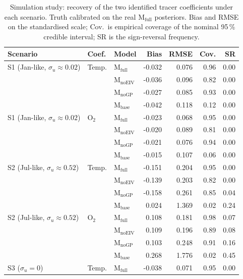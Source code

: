 \begin{table}[h!]
  \caption{Simulation study: recovery of the two identified tracer
           coefficients under each scenario. Truth calibrated on the real
           $\mathrm{M_{full}}$ posteriors. Bias and RMSE on the standardised
           scale; Cov.\ is empirical coverage of the nominal 95\,\% credible
           interval; SR is the sign-reversal frequency.}
  \label{tab:sim_tracers}
  \centering
  \small
  \begin{tabular}{lllrrrr}
    \toprule
    Scenario & Coef. & Model & Bias & RMSE & Cov. & SR \\
    \midrule
    S1 (Jan-like, $\sigma_u\!\approx\!0.02$) & Temp. & $\mathrm{M_{full}}$ & -0.032 & 0.076 & 0.96 & 0.00 \\
     &  & $\mathrm{M_{noEIV}}$ & -0.036 & 0.096 & 0.82 & 0.00 \\
     &  & $\mathrm{M_{noGP}}$ & -0.027 & 0.085 & 0.93 & 0.00 \\
     &  & $\mathrm{M_{base}}$ & -0.042 & 0.118 & 0.12 & 0.00 \\
    \addlinespace
    S1 (Jan-like, $\sigma_u\!\approx\!0.02$) & O$_2$ & $\mathrm{M_{full}}$ & -0.023 & 0.068 & 0.95 & 0.00 \\
     &  & $\mathrm{M_{noEIV}}$ & -0.020 & 0.089 & 0.81 & 0.00 \\
     &  & $\mathrm{M_{noGP}}$ & -0.021 & 0.076 & 0.94 & 0.00 \\
     &  & $\mathrm{M_{base}}$ & -0.015 & 0.107 & 0.06 & 0.00 \\
    \addlinespace
    S2 (Jul-like, $\sigma_u\!\approx\!0.52$) & Temp. & $\mathrm{M_{full}}$ & -0.151 & 0.204 & 0.95 & 0.00 \\
     &  & $\mathrm{M_{noEIV}}$ & -0.139 & 0.203 & 0.82 & 0.00 \\
     &  & $\mathrm{M_{noGP}}$ & -0.158 & 0.261 & 0.85 & 0.04 \\
     &  & $\mathrm{M_{base}}$ & 0.024 & 1.369 & 0.02 & 0.24 \\
    \addlinespace
    S2 (Jul-like, $\sigma_u\!\approx\!0.52$) & O$_2$ & $\mathrm{M_{full}}$ & 0.108 & 0.181 & 0.98 & 0.07 \\
     &  & $\mathrm{M_{noEIV}}$ & 0.109 & 0.196 & 0.89 & 0.08 \\
     &  & $\mathrm{M_{noGP}}$ & 0.103 & 0.248 & 0.91 & 0.16 \\
     &  & $\mathrm{M_{base}}$ & 0.268 & 1.776 & 0.02 & 0.45 \\
    \addlinespace
    S3 ($\sigma_u\!=\!0$) & Temp. & $\mathrm{M_{full}}$ & -0.038 & 0.071 & 0.95 & 0.00 \\

\end{tabular}
\end{table}
